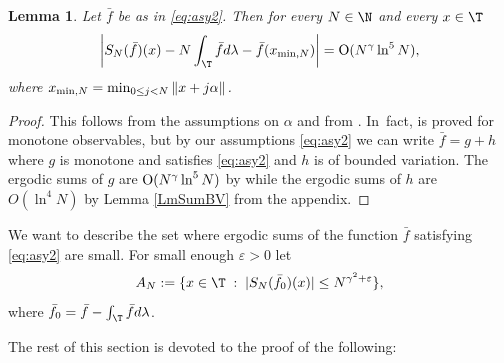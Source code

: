 \documentclass[JEP,XML,SOM,Unicode,NoFloatCountersInSection]{cedram}
\let\DS\relax
\let\eps\varepsilon
\theoremstyle{definition}
\theoremstyle{plain}
\newtheorem{lemma}[definition]{Lemma}
\begin{document}
 \label{sec.preliminaries}

\begin{lemma}\label{lem:DK0}Let $\bar{f}$ be as in \eqref{eq:asy2}. Then for every $N\in \N$ and every $x\in \T$
\[
\biggl|S_N(\bar{f})(x)- N\int_\T \bar{f}d \lambda-\bar{f}(x_{\min,N})\biggr|={\rm O}(N^\gamma\ln^{5} N),
\]
where $x_{\min,N}=\DS \min_{0\leq j<N} \|x+j\alpha\|$.
\end{lemma}

\begin{proof}
This follows from the assumptions on $\alpha$ and from \cite[Prop.\,5.2]{CW}.
In~fact, \cite[Prop.\,5.2]{CW} is proved for monotone observables,
but by our assumptions \eqref{eq:asy2} we can write $\bar{f}=g+h$ where $g$ is monotone and satisfies \eqref{eq:asy2} and $h$ is of bounded variation.
The ergodic sums of $g$ are ${\rm O}(N^\gamma\ln^{5} N)$ by \cite{CW}
while the ergodic sums of $h$ are $O(\ln^4 N)$ by Lemma \ref{LmSumBV}
{from the appendix}.
\end{proof}

We want to describe the set where ergodic sums of the function $\bar{f}$ satisfying \eqref{eq:asy2} are small. For small enough $\eps>0$ let
\begin{equation}\label{eq:an0}
A_N:=\{x\in \T\;:\; |S_N(\bar{f}_0)(x)|\leq N^{\gamma^2+\eps}\},
\end{equation}
where $\bar{f}_0=\bar{f}-\int_\T \bar{f} d \lambda$.

The rest of this section is devoted to the proof of the following:
\end{document}
